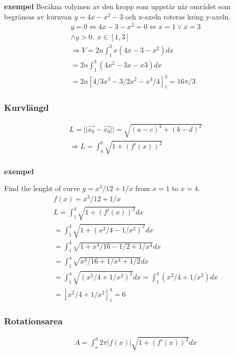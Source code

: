 \begin{multicols}{2}
\textbf{exempel}
Beräkna volymen av den kropp som uppstår när området som begränsas av kurnvan
$y=4x-x^2-3$ och x-axeln roteras kring y-axeln.
\begin{align*}
  &y=0 \Leftrightarrow 4x-3-x^2=0 \Leftrightarrow x=1 \lor x=3 \\
  &\land y>0, \; x\in[1,3] \\
  &\Rightarrow V = 2n\int_1^3 x(4x-3-x^2)dx \\
  &= 2n \int_1^3(4x^2-3x-x3)dx \\
  &= 2n[4/3x^3-3/2x^2-x^4/4]_1^3 = 16\pi/3
\end{align*}


\subsubsection{Kurvlängd}
\begin{align*}
  &L=||\vec{x_0} -\vec{x_0}|| = \sqrt{{(a-c)}^2 + {(b-d)}^2} \\
  &\Rightarrow L= \int_a^b \sqrt{1+{(f'(x))}^2} \\
\end{align*}

\textbf{exempel}\par
Find the lenght of curve $y=x^3/12+1/x$ from $x=1$ to $x=4$.
\begin{align*}
  &f(x)=x^3/12+1/x  \\
  &L = \int_1^4\sqrt{1+{(f'(x))}^2}dx \\
  &= \int_1^4\sqrt{1+{(x^2/4-1/x^2)}^2}dx \\
  &= \int_1^4\sqrt{1+x^4/16-1/2+1/x^4}dx \\
  &= \int_1^4\sqrt{x^4/16+1/x^4+1/2}dx \\
  &= \int_1^4\sqrt{{(x^2/4+1/x^2)}^2}dx = \int_1^4(x^2/4+1/x^2)dx \\
  &= {[x^2/4+1/x^2]}_1^4 = 6
\end{align*}


\subsubsection{Rotationsarea}
\begin{align*}
  &A = \int_a^b 2\pi|f(x)|\sqrt{1+{(f'(x))}^2} dx \\
\end{align*}


\end{multicols}
